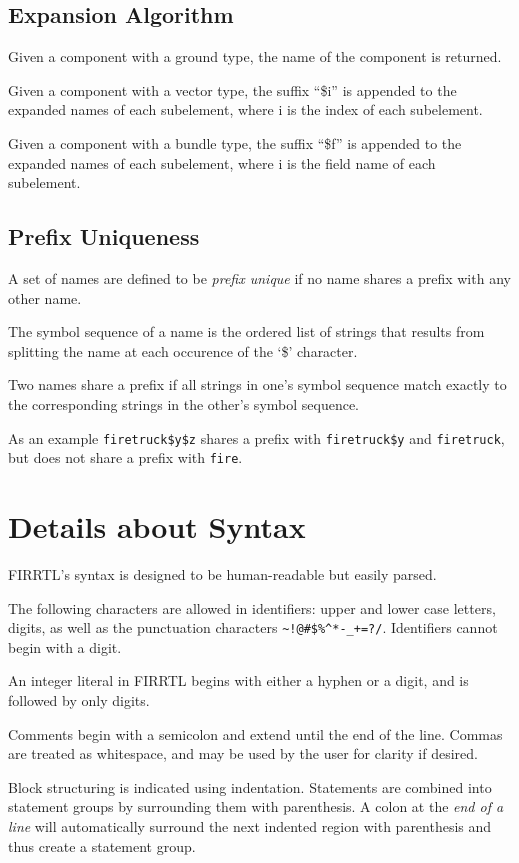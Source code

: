 \documentclass[12pt]{article}
\begin{document}
\subsection{Expansion Algorithm}

Given a component with a ground type, the name of the component is returned.

Given a component with a vector type, the suffix ``\$i'' is appended to the expanded names of each subelement, where i is the index of each subelement.

Given a component with a bundle type, the suffix ``\$f'' is appended to the expanded names of each subelement, where i is the field name of each subelement.

\subsection{Prefix Uniqueness}

A set of names are defined to be {\em prefix unique} if no name shares a prefix with any other name.

The symbol sequence of a name is the ordered list of strings that results from splitting the name at each occurence of the `\$' character.

Two names share a prefix if all strings in one's symbol sequence match exactly to the corresponding strings in the other's symbol sequence.

As an example \verb|firetruck$y$z| shares a prefix with \verb|firetruck$y| and \verb|firetruck|, but does not share a prefix with \verb|fire|.

\section{Details about Syntax}

FIRRTL's syntax is designed to be human-readable but easily parsed.

The following characters are allowed in identifiers: upper and lower case letters, digits, as well as the punctuation characters \verb|~!@#$%^*-_+=?/|. Identifiers cannot begin with a digit. 

An integer literal in FIRRTL begins with either a hyphen or a digit, and is followed by only digits. 

Comments begin with a semicolon and extend until the end of the line. Commas are treated as whitespace, and may be used by the user for clarity if desired.

Block structuring is indicated using indentation. Statements are combined into statement groups by surrounding them with parenthesis. A colon at the {\em end of a line} will automatically surround the next indented region with parenthesis and thus create a statement group.
\end{document}
